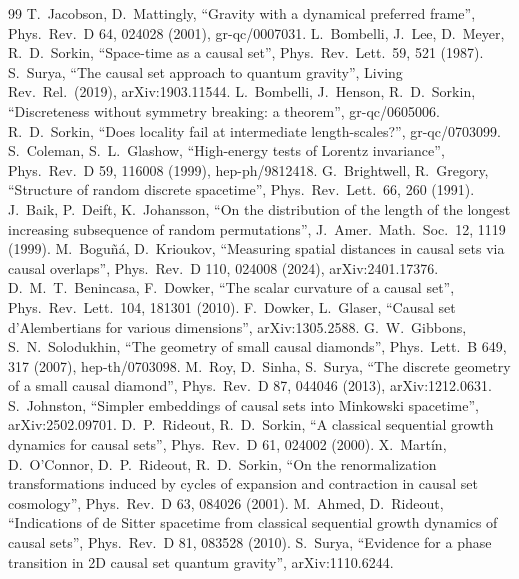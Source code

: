 \documentclass[11pt,a4paper]{article}
\begin{document}
\begin{thebibliography}{99}\small
{} T.~Jacobson, D.~Mattingly, ``Gravity with a dynamical preferred frame'', Phys.\ Rev.\ D 64, 024028 (2001), gr-qc/0007031.
 L.~Bombelli, J.~Lee, D.~Meyer, R.~D.~Sorkin, ``Space-time as a causal set'', Phys.\ Rev.\ Lett.\ 59, 521 (1987).
 S.~Surya, ``The causal set approach to quantum gravity'', Living Rev.\ Rel.\ (2019), arXiv:1903.11544.
 L.~Bombelli, J.~Henson, R.~D.~Sorkin, ``Discreteness without symmetry breaking: a theorem'', gr-qc/0605006.
 R.~D.~Sorkin, ``Does locality fail at intermediate length-scales?'', gr-qc/0703099.
 S.~Coleman, S.~L.~Glashow, ``High-energy tests of Lorentz invariance'', Phys.\ Rev.\ D 59, 116008 (1999), hep-ph/9812418.
 G.~Brightwell, R.~Gregory, ``Structure of random discrete spacetime'', Phys.\ Rev.\ Lett.\ 66, 260 (1991).
 J.~Baik, P.~Deift, K.~Johansson, ``On the distribution of the length of the longest increasing subsequence of random permutations'', J.\ Amer.\ Math.\ Soc.\ 12, 1119 (1999).
 M.~Boguñá, D.~Krioukov, ``Measuring spatial distances in causal sets via causal overlaps'', Phys.\ Rev.\ D 110, 024008 (2024), arXiv:2401.17376.
 D.~M.~T.~Benincasa, F.~Dowker, ``The scalar curvature of a causal set'', Phys.\ Rev.\ Lett.\ 104, 181301 (2010).
 F.~Dowker, L.~Glaser, ``Causal set d'Alembertians for various dimensions'', arXiv:1305.2588.
 G.~W.~Gibbons, S.~N.~Solodukhin, ``The geometry of small causal diamonds'', Phys.\ Lett.\ B 649, 317 (2007), hep-th/0703098.
 M.~Roy, D.~Sinha, S.~Surya, ``The discrete geometry of a small causal diamond'', Phys.\ Rev.\ D 87, 044046 (2013), arXiv:1212.0631.
 S.~Johnston, ``Simpler embeddings of causal sets into Minkowski spacetime'', arXiv:2502.09701.
 D.~P.~Rideout, R.~D.~Sorkin, ``A classical sequential growth dynamics for causal sets'', Phys.\ Rev.\ D 61, 024002 (2000).
 X.~Mart\'in, D.~O'Connor, D.~P.~Rideout, R.~D.~Sorkin, ``On the renormalization transformations induced by cycles of expansion and contraction in causal set cosmology'', Phys.\ Rev.\ D 63, 084026 (2001).
 M.~Ahmed, D.~Rideout, ``Indications of de Sitter spacetime from classical sequential growth dynamics of causal sets'', Phys.\ Rev.\ D 81, 083528 (2010).
 S.~Surya, ``Evidence for a phase transition in 2D causal set quantum gravity'', arXiv:1110.6244.

\end{thebibliography}
\end{document}
